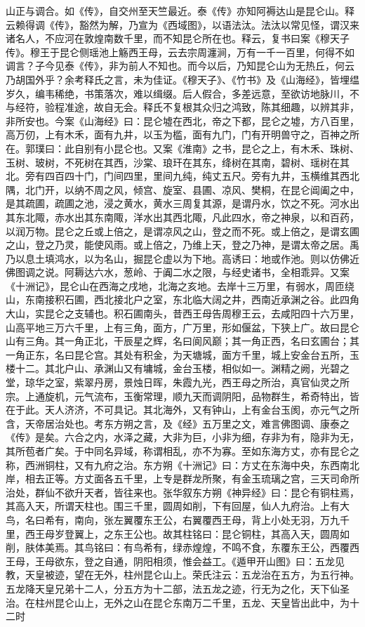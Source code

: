 \documentclass[12pt,UTF8]{ctexbook}
\begin{document}
山正与调合。如《传》，自交州至天竺最近。泰《传》亦知阿褥达山是昆仑山。释云赖得调《传》，豁然为解，乃宣为《西域图》，以语法汰。法汰以常见怪，谓汉来诸名人，不应河在敦煌南数千里，而不知昆仑所在也。释云，复书曰案《穆天子传》。穆王于昆仑侧瑶池上觞西王母，云去宗周瀍涧，万有一千一百里，何得不如调言？子今见泰《传》，非为前人不知也。而今以后，乃知昆仑山为无热丘，何云乃胡国外乎？余考释氏之言，未为佳证。《穆天子》、《竹书》及《山海经》，皆埋缊岁久，编韦稀绝，书策落次，难以缉缀。后人假合，多差远意，至欲访地脉川，不与经符，验程准途，故自无会。释氏不复根其众归之鸿致，陈其细趣，以辨其非，非所安也。今案《山海经》曰：昆仑墟在西北，帝之下都，昆仑之墟，方八百里，高万仞，上有木禾，面有九井，以玉为槛，面有九门，门有开明兽守之，百神之所在。郭璞曰：此自别有小昆仑也。又案《淮南》之书，昆仑之上，有木禾、珠树、玉树、玻树，不死树在其西，沙棠、琅玕在其东，绛树在其南，碧树、瑶树在其北。旁有四百四十门，门间四里，里间九纯，纯丈五尺。旁有九井，玉横维其西北隅，北门开，以纳不周之风，倾宫、旋室、县圃、凉风、樊桐，在昆仑阊阖之中，是其疏圃，疏圃之池，浸之黄水，黄水三周复其源，是谓丹水，饮之不死。河水出其东北陬，赤水出其东南陬，洋水出其西北陬，凡此四水，帝之神泉，以和百药，以润万物。昆仑之丘或上倍之，是谓凉风之山，登之而不死。或上倍之，是谓玄圃之山，登之乃灵，能使风雨。或上倍之，乃维上天，登之乃神，是谓太帝之居。禹乃以息土填鸿水，以为名山，掘昆仑虚以为下地。高诱曰：地或作池。则以仿佛近佛图调之说。阿耨达六水，葱岭、于阗二水之限，与经史诸书，全相乖异。又案《十洲记》，昆仑山在西海之戌地，北海之亥地。去岸十三万里，有弱水，周匝绕山，东南接积石圃，西北接北户之室，东北临大阔之井，西南近承渊之谷。此四角大山，实昆仑之支辅也。积石圃南头，昔西王母告周穆王云，去咸阳四十六万里，山高平地三万六千里，上有三角，面方，广万里，形如偃盆，下狭上广。故曰昆仑山有三角。其一角正北，干辰星之辉，名曰阆风巅；其一角正西，名曰玄圃台；其一角正东，名曰昆仑宫。其处有积金，为天塘城，面方千里，城上安金台五所，玉楼十二。其北户山、承渊山又有墉城，金台玉楼，相似如一。渊精之阙，光碧之堂，琼华之室，紫翠丹房，景烛日晖，朱霞九光，西王母之所治，真官仙灵之所宗。上通旋机，元气流布，玉衡常理，顺九天而调阴阳，品物群生，希奇特出，皆在于此。天人济济，不可具记。其北海外，又有钟山，上有金台玉阂，亦元气之所含，天帝居治处也。考东方朔之言，及《经》五万里之文，难言佛图调、康泰之《传》是矣。六合之内，水泽之藏，大非为巨，小非为细，存非为有，隐非为无，其所苞者广矣。于中同名异域，称谓相乱，亦不为寡。至如东海方丈，亦有昆仑之称，西洲铜柱，又有九府之治。东方朔《十洲记》曰：方丈在东海中央，东西南北岸，相去正等。方丈面各五千里，上专是群龙所聚，有金玉琉璃之宫，三天司命所治处，群仙不欲升天者，皆往来也。张华叙东方朔《神异经》曰：昆仑有铜柱焉，其高入天，所谓天柱也。围三千里，圆周如削，下有回屋，仙人九府治。上有大鸟，名曰希有，南向，张左翼覆东王公，右翼覆西王母，背上小处无羽，万九千里，西王母岁登翼上，之东王公也。故其柱铭曰：昆仑铜柱，其高入天，圆周如削，肤体美焉。其鸟铭曰：有鸟希有，绿赤煌煌，不鸣不食，东覆东王公，西覆西王母，王母欲东，登之自通，阴阳相须，惟会益工。《遁甲开山图》曰：五龙见教，天皇被迹，望在无外，柱州昆仑山上。荣氏注云：五龙治在五方，为五行神。五龙降天皇兄弟十二人，分五方为十二部，法五龙之迹，行无为之化，天下仙圣治。在柱州昆仑山上，无外之山在昆仑东南万二千里，五龙、天皇皆出此中，为十二时
\end{document}
